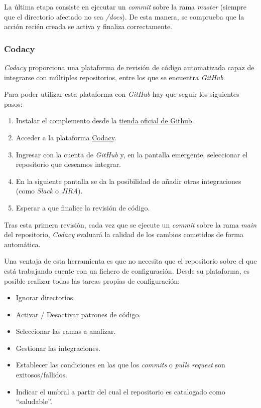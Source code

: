 La última etapa consiste en ejecutar un \emph{commit} sobre la rama
\emph{master} (siempre que el directorio afectado no sea \emph{/docs}).
De esta manera, se comprueba que la acción recién creada se activa y
finaliza correctamente.


\subsubsection{Codacy}

\emph{Codacy} proporciona una plataforma de revisión de código
automatizada capaz de integrarse con múltiples repositorios, entre los
que se encuentra \emph{GitHub}.

Para poder utilizar esta plataforma con \emph{GitHub} hay que seguir los
siguientes pasos:

\begin{enumerate}
\def\labelenumi{\arabic{enumi}.}
\tightlist
\item
  Instalar el complemento desde la
  \href{https://github.com/marketplace/codacy}{tienda oficial de
  Github}.
\item
  Acceder a la plataforma \href{https://codacy.com}{Codacy}.
\item
  Ingresar con la cuenta de \emph{GitHub} y, en la pantalla emergente,
  seleccionar el repositorio que deseamos integrar.
\item
  En la siguiente pantalla se da la posibilidad de añadir otras
  integraciones (como \emph{Slack} o \emph{JIRA}).
\item
  Esperar a que finalice la revisión de código.
\end{enumerate}


Tras esta primera revisión, cada vez que se ejecute un \emph{commit}
sobre la rama \emph{main} del repositorio, \emph{Codacy} evaluará la
calidad de los cambios cometidos de forma automática.

Una ventaja de esta herramienta es que no necesita que el repositorio
sobre el que está trabajando cuente con un fichero de configuración.
Desde su plataforma, es posible realizar todas las tareas propias de
configuración:

\begin{itemize}
\tightlist
\item
  Ignorar directorios.
\item
  Activar / Desactivar patrones de código.
\item
  Seleccionar las ramas a analizar.
\item
  Gestionar las integraciones.
\item
  Establecer las condiciones en las que los \emph{commits} o \emph{pulls
  request} son exitosos/fallidos.
\item
  Indicar el umbral a partir del cual el repositorio es catalogado como
  ``saludable''.
\end{itemize}

